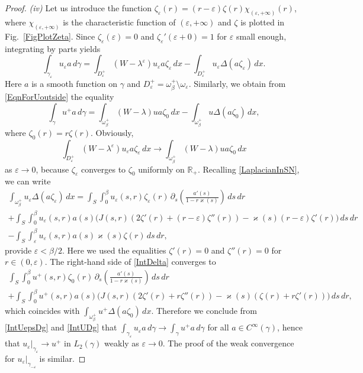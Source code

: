 \documentclass[reqno]{amsart}
\theoremstyle{plain}
\numberwithin{equation}{section}
\renewcommand{\kappa}{\varkappa}
\newcommand{\Real}{\mathbb R}
\newcommand{\eps}{\varepsilon}
\begin{document}
\begin{proof}
\textit{(iv)}
Let us introduce the function
$\zeta_\eps(r)=(r-\eps)\zeta(r)\chi_{(\eps,+\infty)}(r)$,
where $\chi_{(\eps,+\infty)}$ is the characteristic function of $(\eps,+\infty)$ and $\zeta$ is  plotted in Fig.~\ref{FigPlotZeta}.
Since $\zeta_\eps(\eps)=0$ and $\zeta_\eps'(\eps+0)=1$ for $\eps$ small enough, integrating by parts yields
\begin{equation}\label{IntUepsDg}
  \int_{\gamma_\eps} u_\eps a \,d\gamma=\int_{D^+_\eps} (W-\lambda^\eps)u_\eps a\zeta_\eps\,dx-\int_{D^+_\eps} u_\eps \Delta (a\zeta_\eps)\,dx.
\end{equation}
Here $a$ is a smooth function on $\gamma$ and $D^+_\eps=\omega_\beta^+\setminus \omega_\eps$.
Similarly, we obtain from \eqref{EqnForUoutside} the equality
 \begin{equation}\label{IntUDg}
  \int_{\gamma} u^+ a \,d\gamma=\int_{\omega_\beta^+} (W-\lambda)u a\zeta_0\,dx-\int_{\omega_\beta^+} u \Delta (a\zeta_0)\,dx,
\end{equation}
where $\zeta_0(r)=r\zeta(r)$.
Obviously,
\begin{equation*}
   \int_{D^+_\eps} (W-\lambda^\eps)u_\eps a\zeta_\eps\,dx\to
   \int_{\omega_\beta^+} (W-\lambda)u a\zeta_0\,dx
\end{equation*}
as $\eps\to 0$, because $\zeta_\eps$ converges to $\zeta_0$ uniformly on $\Real_+$. Recalling \eqref{LaplacianInSN}, we can write
\begin{multline}\label{IntDelta}
  \int_{\omega_\beta^+}u_\eps \Delta (a\zeta_\eps)\,dx=
  \int_{S} \int_0^\beta u_\eps(s,r)\zeta_\eps(r) \,\partial_s\left(\frac{a'(s)}{1-r \kappa(s)}\right)\,ds\,dr
  \\
  +\int_{S} \int_0^\beta u_\eps(s,r)a(s)\big(J(s,r)(2\zeta'(r)+(r-\eps)\zeta''(r))
  -\kappa(s)(r-\eps)\zeta'(r)\big)\,ds\,dr\\
  -
  \int_{S} \int_\eps^\beta u_\eps(s,r)a(s)\kappa(s)\zeta(r)\,ds\,dr,
\end{multline}
provide $\eps<\beta/2$. Here we used  the equalities $\zeta'(r)=0$ and $\zeta''(r)=0$ for $r\in(0,\eps)$.
The right-hand side of \eqref{IntDelta} converges to
\begin{multline*}
   \int_{S} \int_0^\beta u^+(s,r)\zeta_0(r) \,\partial_s\left(\frac{a'(s)}{1-r \kappa(s)}\right)\,ds\,dr
  \\
  +\int_{S} \int_0^\beta u^+(s,r)a(s)\big(J(s,r)(2\zeta'(r)+r\zeta''(r))
  -\kappa(s)(\zeta(r)+r\zeta'(r))\big)\,ds\,dr,
\end{multline*}
which coincides with $\int_{\omega_\beta^+}u^+ \Delta (a\zeta_0)\,dx$.
Therefore we conclude from \eqref{IntUepsDg} and \eqref{IntUDg} that
$\int_{\gamma_\eps} u_\eps a \,d\gamma\to \int_{\gamma} u^+ a \,d\gamma$ for all $a\in C^\infty(\gamma)$, hence that  $u_\eps|_{\gamma_{\eps}}\to u^+$ in $L_2(\gamma)$ weakly as $\eps\to 0$. The proof of the weak convergence for   $u_\eps|_{\gamma_{-\eps}}$ is similar.
\end{proof}
\end{document}
